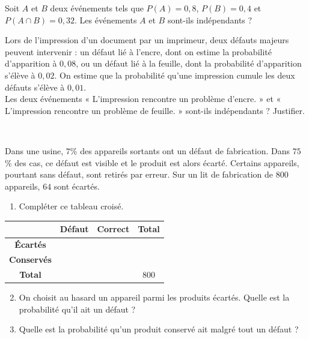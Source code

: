 \documentclass[11pt]{article}
\begin{document}
\begin{exo}
  Soit $A$ et $B$ deux événements tels que $P(A) = 0,8$, $P\left( B
  \right) = 0,4$ et $P\left( A\cap B \right)=0,32$. Les événements $A$ et $B$
  sont-ils indépendants ?
\end{exo}

\begin{exo}
  Lors de l'impression d'un document par un imprimeur, deux défauts majeurs
  peuvent intervenir : un défaut lié à l'encre, dont on estime la probabilité
  d'apparition à $0,08$, ou un défaut lié à la feuille, dont la probabilité
  d'apparition s'élève à $0,02$. On estime que la probabilité qu'une impression
  cumule les deux défauts s'élève à $0,01$.\\
  Les deux événements « L'impression rencontre un problème d'encre. » et «
  L'impression rencontre un problème de feuille. » sont-ils indépendants ?
  Justifier.
\end{exo}

\begin{exo}~\\
\begin{minipage}{.5\textwidth}
  Dans une usine, $7$\% des appareils sortants ont un défaut de fabrication.
  Dans $75$\% des cas, ce défaut est visible et le produit est alors écarté.
  Certains appareils, pourtant sans défaut, sont retirés par erreur. Sur un lit
  de fabrication de $800$ appareils, $64$ sont écartés.
  \begin{enumerate}
    \item Compléter ce tableau croisé.
  \end{enumerate}
\end{minipage}
\begin{minipage}{.5\textwidth}
\begin{center}
\renewcommand{\arraystretch}{2}
\begin{tabular}{|c|c|c|c|}
  \cline{2-4}
  \multicolumn{1}{c|}{} & \textbf{Défaut} & \textbf{Correct} &
  \textbf{Total} \\
  \hline
  \textbf{Écartés} & & & \\
  \hline
  \textbf{Conservés} & & & \\
  \hline
  \textbf{Total} & & & $800$ \\
  \hline
\end{tabular}
\end{center}
\end{minipage}
  \begin{enumerate}
    \setcounter{enumi}{1}
    \item On choisit au hasard un appareil parmi les produits écartés. Quelle
      est la probabilité qu'il ait un défaut ?
    \item Quelle est la probabilité qu'un produit conservé ait malgré tout un
      défaut ?
  \end{enumerate}
\end{exo}
\end{document}
